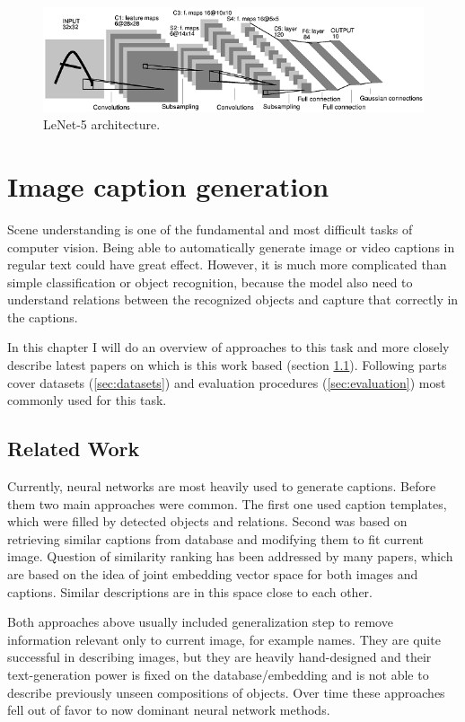 \begin{figure}
	\centering
	\includegraphics[width=\textwidth]{./fig/lenet-architecture.png}
	\caption{LeNet-5 architecture.\cite{lecun-98}
		\label{fig:lenet}}
\end{figure}

\chapter{Image caption generation}\label{chp:captions}

Scene understanding is one of the fundamental and most difficult tasks of computer vision. Being able to automatically generate image or video captions in regular text could have great effect. However, it is much more complicated than simple classification or object recognition, because the model also need to understand relations between the recognized objects and capture that correctly in the captions.

In this chapter I will do an overview of approaches to this task and more closely describe latest papers on which is this work based (section \ref{sec:related}). Following parts cover datasets (\ref{sec:datasets}) and evaluation procedures (\ref{sec:evaluation}) most commonly used for this task.

	\section{Related Work}
	\label{sec:related}
	
Currently, neural networks are most heavily used to generate captions. Before them two main approaches were common. The first one used caption templates, which were filled by detected objects and relations. Second was based on retrieving similar captions from database and modifying them to fit current image. Question of similarity ranking has been addressed by many papers, which are based on the idea of joint embedding vector space for both images and captions\cite{DBLP:journals/corr/KarpathyF14}. Similar descriptions are in this space close to each other.

Both approaches above usually included generalization step to remove information relevant only to current image, for example names. They are quite successful in describing images, but they are heavily hand-designed and their text-generation power is fixed on the database/embedding and is not able to describe previously unseen compositions of objects. Over time these approaches fell out of favor to now dominant neural network methods.

